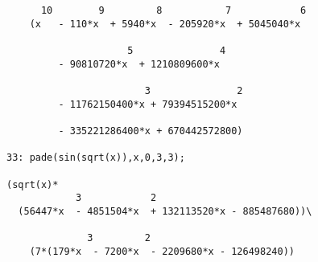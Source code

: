 \begin{verbatim}
      10        9         8           7            6
    (x   - 110*x  + 5940*x  - 205920*x  + 5045040*x

                     5               4
         - 90810720*x  + 1210809600*x 

                        3               2
         - 11762150400*x + 79394515200*x  

         - 335221286400*x + 670442572800)

33: pade(sin(sqrt(x)),x,0,3,3);
        
(sqrt(x)*
            3            2
  (56447*x  - 4851504*x  + 132113520*x - 885487680))\

              3         2
    (7*(179*x  - 7200*x  - 2209680*x - 126498240))
\end{verbatim}

